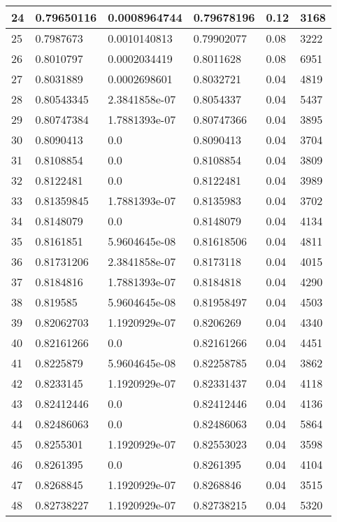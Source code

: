\begin{longtable}{|l|l|l|l|l|l|}
24 & 0.79650116 & 0.0008964744 & 0.79678196 & 0.12 & 3168 \\ \hline 
25 & 0.7987673 & 0.0010140813 & 0.79902077 & 0.08 & 3222 \\ \hline 
26 & 0.8010797 & 0.0002034419 & 0.8011628 & 0.08 & 6951 \\ \hline 
27 & 0.8031889 & 0.0002698601 & 0.8032721 & 0.04 & 4819 \\ \hline 
28 & 0.80543345 & 2.3841858e-07 & 0.8054337 & 0.04 & 5437 \\ \hline 
29 & 0.80747384 & 1.7881393e-07 & 0.80747366 & 0.04 & 3895 \\ \hline 
30 & 0.8090413 & 0.0 & 0.8090413 & 0.04 & 3704 \\ \hline 
31 & 0.8108854 & 0.0 & 0.8108854 & 0.04 & 3809 \\ \hline 
32 & 0.8122481 & 0.0 & 0.8122481 & 0.04 & 3989 \\ \hline 
33 & 0.81359845 & 1.7881393e-07 & 0.8135983 & 0.04 & 3702 \\ \hline 
34 & 0.8148079 & 0.0 & 0.8148079 & 0.04 & 4134 \\ \hline 
35 & 0.8161851 & 5.9604645e-08 & 0.81618506 & 0.04 & 4811 \\ \hline 
36 & 0.81731206 & 2.3841858e-07 & 0.8173118 & 0.04 & 4015 \\ \hline 
37 & 0.8184816 & 1.7881393e-07 & 0.8184818 & 0.04 & 4290 \\ \hline 
38 & 0.819585 & 5.9604645e-08 & 0.81958497 & 0.04 & 4503 \\ \hline 
39 & 0.82062703 & 1.1920929e-07 & 0.8206269 & 0.04 & 4340 \\ \hline 
40 & 0.82161266 & 0.0 & 0.82161266 & 0.04 & 4451 \\ \hline 
41 & 0.8225879 & 5.9604645e-08 & 0.82258785 & 0.04 & 3862 \\ \hline 
42 & 0.8233145 & 1.1920929e-07 & 0.82331437 & 0.04 & 4118 \\ \hline 
43 & 0.82412446 & 0.0 & 0.82412446 & 0.04 & 4136 \\ \hline 
44 & 0.82486063 & 0.0 & 0.82486063 & 0.04 & 5864 \\ \hline 
45 & 0.8255301 & 1.1920929e-07 & 0.82553023 & 0.04 & 3598 \\ \hline 
46 & 0.8261395 & 0.0 & 0.8261395 & 0.04 & 4104 \\ \hline 
47 & 0.8268845 & 1.1920929e-07 & 0.8268846 & 0.04 & 3515 \\ \hline 
48 & 0.82738227 & 1.1920929e-07 & 0.82738215 & 0.04 & 5320 \\ \hline 

\end{longtable}
